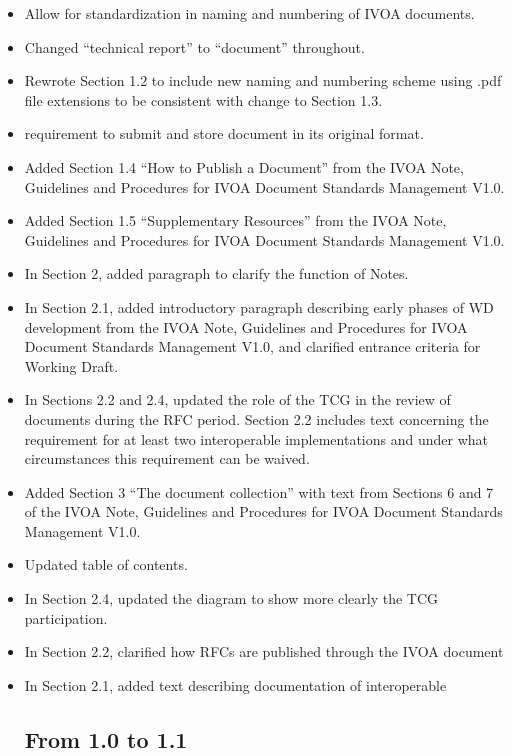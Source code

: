 \documentclass[11pt,a4paper]{ivoa}
\begin{document}
\begin{itemize}
\item Allow for standardization in naming and numbering of IVOA documents.
\item  Changed “technical report” to “document” throughout.
\item  Rewrote Section 1.2 to include new naming and numbering scheme using
.pdf file extensions to be consistent with change to Section 1.3.
\item requirement to submit and store document in its original format.
\item  Added Section 1.4 “How to Publish a Document” from the IVOA Note,
Guidelines and Procedures for IVOA Document Standards Management V1.0.
\item  Added Section 1.5 “Supplementary Resources” from the IVOA Note,
Guidelines and Procedures for IVOA Document Standards Management V1.0.
\item In Section 2, added paragraph to clarify the function of Notes.
\item In Section 2.1, added introductory paragraph describing early phases of
WD development from the IVOA Note, Guidelines and Procedures for IVOA
Document Standards Management V1.0, and clarified entrance criteria for
Working Draft.
\item In Sections 2.2 and 2.4, updated the role of the TCG in the review of
documents during the RFC period.  Section 2.2 includes text concerning
the requirement for at least two interoperable implementations and under
what circumstances this requirement can be waived.

\item  Added Section 3 “The document collection” with text from Sections 6
and 7 of the IVOA Note, Guidelines and Procedures for IVOA Document
Standards Management V1.0.
\item  Updated table of contents.

\item In Section 2.4, updated the diagram to show more clearly the TCG participation.

\item In Section 2.2, clarified how RFCs are published through the IVOA document

\item In Section 2.1, added text describing documentation of interoperable

\subsection{From 1.0 to 1.1}


\end{itemize}
\end{document}
